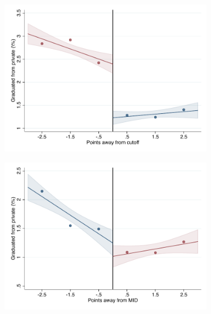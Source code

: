 \documentclass[oneside,11pt]{article}
\begin{document}
\begin{figure}[H]
\begin{center}
    \begin{subfigure}{0.475\textwidth}
        \centering
        \includegraphics[width=\textwidth]{04_Figures/rd_plot_tau_ENLACE_Privado_Un_UNAM3.pdf}
    \end{subfigure}
    \begin{subfigure}{0.475\textwidth}
        \centering
        \includegraphics[width=\textwidth]{04_Figures/rd_plot_mid_ENLACE_Privado_Un_UNAM3.pdf}
    \end{subfigure}


\end{center}
\end{figure}
\end{document}
